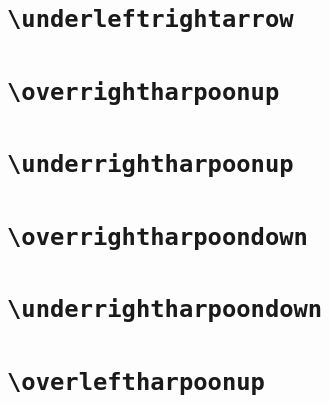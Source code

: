 \documentclass[12pt]{article}
\begin{document}
\begin{dispExample}
\end{dispExample}

\section{\texttt{\textbackslash underleftrightarrow}}

\begin{dispExample}
\end{dispExample}

\section{\texttt{\textbackslash overrightharpoonup}}

\begin{dispExample}
\end{dispExample}

\section{\texttt{\textbackslash underrightharpoonup}}

\begin{dispExample}
\end{dispExample}

\section{\texttt{\textbackslash overrightharpoondown}}

\begin{dispExample}
\end{dispExample}

\section{\texttt{\textbackslash underrightharpoondown}}

\begin{dispExample}
\end{dispExample}

\section{\texttt{\textbackslash overleftharpoonup}}
\end{document}
